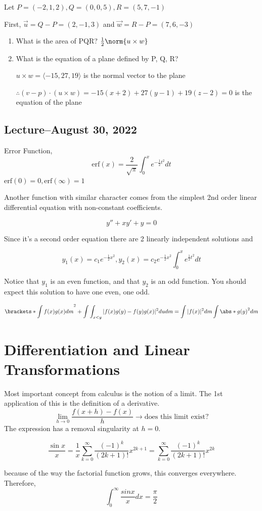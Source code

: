 \documentclass{scrreprt}
\begin{document}
\begin{example}
	Let $P = (-2, 1, 2), Q = (0, 0, 5), R = (5, 7, -1)$

	First, $\vec{u} = Q - P = (2, -1, 3)$ and $\vec{w} = R - P = (7, 6, -3)$

	\begin{enumerate}
		\item What is the area of PQR? $\frac{1}{2} \norm{u\times w}$
		\item What is the equation of a plane defined by P, Q, R?

		      $u\times w = \langle -15, 27, 19 \rangle$ is the normal vector to the plane

		      $\therefore (v - p) \cdot (u\times w) = -15(x + 2) + 27(y - 1) + 19(z-2) = 0$ is the equation of the plane
	\end{enumerate}
\end{example}

\subsection{Lecture--August 30, 2022}

Error Function, \[ \text{erf}(x) = \frac{2}{\sqrt{\pi}}\int_0^x e^{-\frac{1}{2}t^2}dt \]
$\text{erf}(0) = 0, \text{erf}(\infty) = 1$

Another function with similar character comes from the simplest 2nd order linear
differential equation with non-constant coefficients.

\[
	y''+xy'+y=0
\]

Since it's a second order equation there are 2 linearly independent solutions and

\[
	y_1(x)=c_1e^{-\frac{1}{2}x^2}, y_2(x) = c_2e^{-\frac{1}{2}x^2}\int_0^xe^{\frac{1}{2}t^2}dt
\]

Notice that $y_1$ is an even function, and that $y_2$ is an odd function. You should
expect this solution to have one even, one odd.

\[
	\brackets*{\int f(x)g(x)dm}^2 + \int \int_{x < y}|f(x)g(y)-f(y)g(x)|^2 du dm
	= \int |f(x)|^2dm\int \abs*{g(y)}^2dm
\]

\section{Differentiation and Linear Transformations}

Most important concept from calculus is the notion of a limit. The 1st application
of this is the definition of a derivative.
\[
	\lim_{h\rightarrow 0}\frac{f(x+h)-f(x)}{h} \rightarrow \text{does this limit exist?}
\]
The expression has a removal singularity at $h=0$.
\begin{example}
	\[
		\frac{\sin x}{x} = \frac{1}{x}\sum_{k=0}^\infty \frac{(-1)^k}{(2k+1)!}x^{2k+1}
		= \sum_{k=0}^\infty \frac{(-1)^k}{(2k+1)!}x^{2k}
	\]
\end{example}
because of the way the factorial function grows, this converges everywhere.
Therefore, \[ \int_0^\infty \frac{sin x}{x} dx = \frac{\pi}{2} \]
\end{document}
